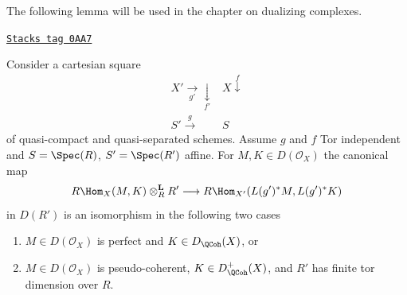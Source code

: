 The following lemma will be used in the chapter on dualizing complexes.

\begin{lemma}
\label{perfect-lemma-affine-morphism-and-hom-out-of-perfect}
\href{https://stacks.math.columbia.edu/tag/0AA7}{\texttt{Stacks tag 0AA7}}

Consider a cartesian square
$$
\begin{array}{cc}X' \underset{g'}{\longrightarrow}\underset{f'}{\downarrow} & X \overset{f}{\downarrow} \\ S' \overset{g}{\longrightarrow} & S\end{array}
$$
of quasi-compact and quasi-separated schemes. Assume $g$ and $f$
Tor independent and $S = \Spec(R)$, $S' = \Spec(R')$ affine. For
$M, K \in D(\mathcal{O}_X)$ the canonical map
$$
R\Hom_X(M, K) \otimes^\mathbf{L}_R R'
\longrightarrow
R\Hom_{X'}(L(g')^*M, L(g')^*K)
$$
in $D(R')$ is an isomorphism in the following two cases
\begin{enumerate}
\item $M \in D(\mathcal{O}_X)$ is perfect and $K \in D_\QCoh(X)$, or
\item $M \in D(\mathcal{O}_X)$ is pseudo-coherent,
$K \in D_\QCoh^+(X)$, and $R'$ has finite tor dimension over $R$.
\end{enumerate}
\end{lemma}

